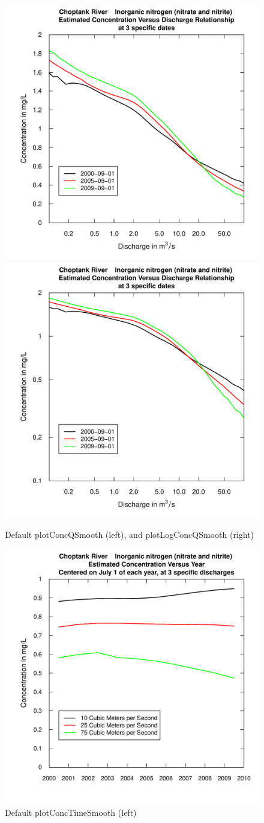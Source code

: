 \documentclass[a4paper,11pt]{article}\usepackage{graphicx, color}
\newenvironment{knitrout}{}{} %
\begin{document}
\begin{knitrout}
\color{fgcolor}\begin{figure}[]

\includegraphics[width=.5\linewidth,height=.5\linewidth]{figure/plotLogConcQSmooth1} 
\includegraphics[width=.5\linewidth,height=.5\linewidth]{figure/plotLogConcQSmooth2} \caption[Default plotConcQSmooth (left), and plotLogConcQSmooth (right)]{Default plotConcQSmooth (left), and plotLogConcQSmooth (right)\label{fig:plotLogConcQSmooth}}
\end{figure}


\end{knitrout}


\begin{knitrout}
\color{fgcolor}\begin{figure}[]

\includegraphics[width=.5\linewidth,height=.5\linewidth]{figure/plotConcTimeSmooth_} \caption[Default plotConcTimeSmooth (left)]{Default plotConcTimeSmooth (left)\label{fig:plotConcTimeSmooth(}}
\end{figure}


\end{knitrout}
\end{document}
